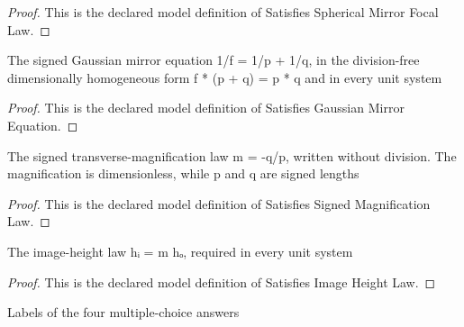 \begin{proof}
  This is the declared model definition of Satisfies Spherical Mirror Focal Law.
\end{proof}
\begin{definition}
  \label{def:physics:phyx-mini-0059:phyxminiproblems-problemphyxmini0059-satisfiesgaussianmirrorequation}
  The signed Gaussian mirror equation 1/f = 1/p + 1/q, in the division-free dimensionally homogeneous form f * (p + q) = p * q and in every unit system
\end{definition}
\begin{proof}
  This is the declared model definition of Satisfies Gaussian Mirror Equation.
\end{proof}
\begin{definition}
  \label{def:physics:phyx-mini-0059:phyxminiproblems-problemphyxmini0059-satisfiessignedmagnificationlaw}
  The signed transverse-magnification law m = -q/p, written without division. The magnification is dimensionless, while p and q are signed lengths
\end{definition}
\begin{proof}
  This is the declared model definition of Satisfies Signed Magnification Law.
\end{proof}
\begin{definition}
  \label{def:physics:phyx-mini-0059:phyxminiproblems-problemphyxmini0059-satisfiesimageheightlaw}
  The image-height law hᵢ = m hₒ, required in every unit system
\end{definition}
\begin{proof}
  This is the declared model definition of Satisfies Image Height Law.
\end{proof}
\begin{definition}
  \label{def:physics:phyx-mini-0059:phyxminiproblems-problemphyxmini0059-answerchoice}
  Labels of the four multiple-choice answers
\end{definition}
